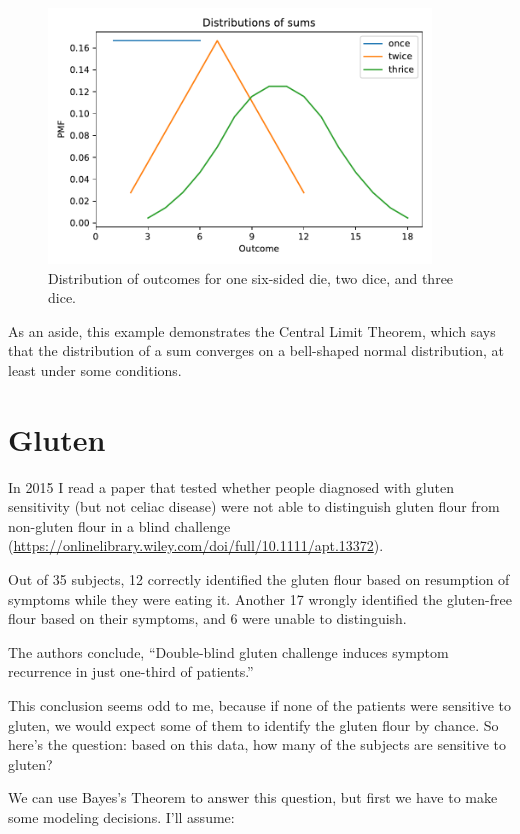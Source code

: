 \documentclass[12pt]{book}
\theoremstyle{exercise}
\begin{document}
\begin{figure}
\centerline{\includegraphics[width=4in]{figs/fig05-01.pdf}}
\caption{Distribution of outcomes for one six-sided die, two dice, and three dice.}
\label{fig05-01}
\end{figure}

As an aside, this example demonstrates the Central Limit Theorem, which says that the distribution of a sum converges on a bell-shaped normal distribution, at least under some conditions.

\section{Gluten}

In 2015 I read a paper that tested whether people diagnosed with gluten sensitivity (but not celiac disease) were not able to distinguish gluten flour from non-gluten flour in a blind challenge (\url{https://onlinelibrary.wiley.com/doi/full/10.1111/apt.13372}).

Out of 35 subjects, 12 correctly identified the gluten flour based on resumption of symptoms while they were eating it.  Another 17 wrongly identified the gluten-free flour based on their symptoms, and 6 were unable to distinguish.  

The authors conclude, ``Double-blind gluten challenge induces symptom recurrence in just one-third of patients.''

This conclusion seems odd to me, because if none of the patients were sensitive to gluten, we would expect some of them to identify the gluten flour by chance.
So here's the question: based on this data, how many of the subjects are sensitive to gluten?

We can use Bayes's Theorem to answer this question, but first we have to make some modeling decisions.
I'll assume:
\end{document}
